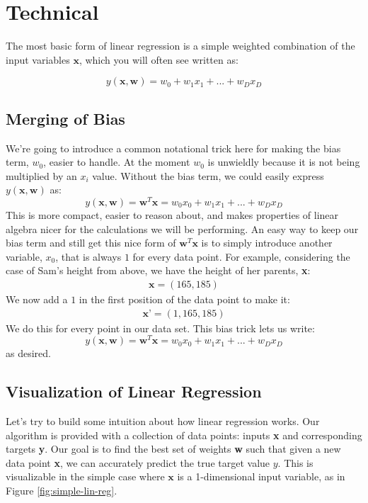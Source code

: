 \section{Technical}
The most basic form of linear regression is a simple weighted combination of the input variables $\textbf{x}$, which you will often see written as:

\begin{equation}
    y(\textbf{x}, \textbf{w}) = w_{0} + w_{1}x_{1} + ... + w_{D}x_{D}
\end{equation}

\subsection{Merging of Bias}
We're going to introduce a common notational trick here for making the bias term, $w_{0}$, easier to handle. At the moment $w_{0}$ is unwieldly because it is not being multiplied by an $x_{i}$ value. Without the bias term, we could easily express $y(\textbf{x}, \textbf{w})$ as:
\begin{equation}
    y(\textbf{x}, \textbf{w}) = \textbf{w}^{T}\textbf{x} = w_{0}x_{0} + w_{1}x_{1} + ... + w_{D}x_{D}
\end{equation}
 This is more compact, easier to reason about, and makes properties of linear algebra nicer for the calculations we will be performing. An easy way to keep our bias term and still get this nice form of $\textbf{w}^{T}\textbf{x}$ is to simply introduce another variable, $x_{0}$, that is always $1$ for every data point. For example, considering the case of Sam's height from above, we have the height of her parents, \textbf{x}:
\begin{align*}
    \textbf{x} = (165, 185)
\end{align*}
We now add a $1$ in the first position of the data point to make it:
\begin{align*}
    \textbf{x'} = (1, 165, 185)
\end{align*}
We do this for every point in our data set. This bias trick lets us write:
\begin{equation}
    y(\textbf{x}, \textbf{w}) = \textbf{w}^{T}\textbf{x} = w_{0}x_{0} + w_{1}x_{1} + ... + w_{D}x_{D}
\end{equation}
as desired.

\subsection{Visualization of Linear Regression}
Let's try to build some intuition about how linear regression works. Our algorithm is provided with a collection of data points: inputs \textbf{x} and corresponding targets \textbf{y}. Our goal is to find the best set of weights \textbf{w} such that given a new data point \textbf{x}, we can accurately predict the true target value $y$. This is visualizable in the simple case where $\textbf{x}$ is a 1-dimensional input variable, as in Figure \ref{fig:simple-lin-reg}.

